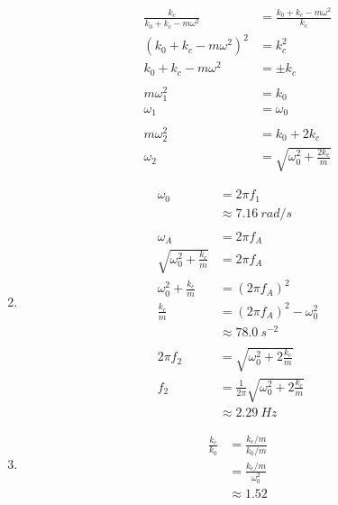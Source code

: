 \documentclass{article}
\begin{document}
\begin{enumerate}
        \begin{align*}
          \frac{k_c}{k_0 + k_c - m \omega^2} & = \frac{k_0 + k_c - m \omega^2}{k_c}  \\
          (k_0 + k_c - m \omega^2)^2         & = k_c^2                               \\
          k_0 + k_c - m \omega^2             & = \pm k_c                             \\ \\
          m \omega_1^2                       & = k_0                                 \\
          \omega_1                           & = \omega_0                            \\ \\
          m \omega_2^2                       & = k_0 + 2 k_c                         \\
          \omega_2                           & = \sqrt{\omega_0^2 + \frac{2 k_c}{m}}
        \end{align*}

  \item

        \begin{align*}
          \omega_0                          & = 2 \pi f_1                                           \\
                                            & \approx \qty{7.16}{rad/s}                             \\ \\
          \omega_A                          & = 2 \pi f_A                                           \\
          \sqrt{\omega_0^2 + \frac{k_c}{m}} & = 2 \pi f_A                                           \\
          \omega_0^2 + \frac{k_c}{m}        & = (2 \pi f_A)^2                                       \\
          \frac{k_c}{m}                     & = (2 \pi f_A)^2 - \omega_0^2                          \\
                                            & \approx \qty{78.0}{s^{-2}}                            \\ \\
          2 \pi f_2                         & = \sqrt{\omega_0^2 + 2 \frac{k_c}{m}}                 \\
          f_2                               & = \frac{1}{2 \pi} \sqrt{\omega_0^2 + 2 \frac{k_c}{m}} \\
                                            & \approx \qty{2.29}{Hz}
        \end{align*}

  \item

        \begin{align*}
          \frac{k_c}{k_0} & = \frac{k_c / m}{k_0 / m}    \\
                          & = \frac{k_c / m}{\omega_0^2} \\
                          & \approx 1.52
        \end{align*}
\end{enumerate}
\end{document}
